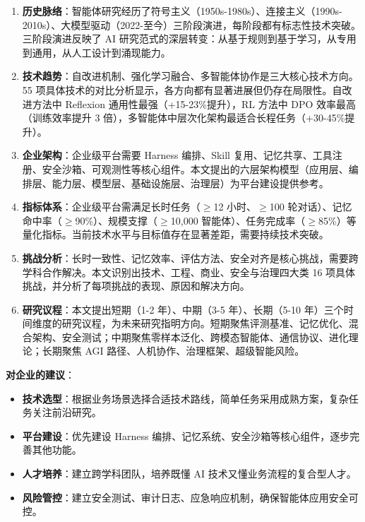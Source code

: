\documentclass[12pt,a4paper]{article}
\begin{document}
\begin{enumerate}
    \item \textbf{历史脉络}：智能体研究经历了符号主义（1950s-1980s）、连接主义（1990s-2010s）、大模型驱动（2022-至今）三阶段演进，每阶段都有标志性技术突破。三阶段演进反映了 AI 研究范式的深层转变：从基于规则到基于学习，从专用到通用，从人工设计到涌现能力。
    
    \item \textbf{技术趋势}：自改进机制、强化学习融合、多智能体协作是三大核心技术方向。55 项具体技术的对比分析显示，各方向都有显著进展但仍存在局限性。自改进方法中 Reflexion 通用性最强（+15-23\%提升），RL 方法中 DPO 效率最高（训练效率提升 3 倍），多智能体中层次化架构最适合长程任务（+30-45\%提升）。
    
    \item \textbf{企业架构}：企业级平台需要 Harness 编排、Skill 复用、记忆共享、工具注册、安全沙箱、可观测性等核心组件。本文提出的六层架构模型（应用层、编排层、能力层、模型层、基础设施层、治理层）为平台建设提供参考。
    
    \item \textbf{指标体系}：企业级平台需满足长时任务（$\geq$12 小时、$\geq$100 轮对话）、记忆命中率（$\geq$90\%）、规模支撑（$\geq$10,000 智能体）、任务完成率（$\geq$85\%）等量化指标。当前技术水平与目标值存在显著差距，需要持续技术突破。
    
    \item \textbf{挑战分析}：长时一致性、记忆效率、评估方法、安全对齐是核心挑战，需要跨学科合作解决。本文识别出技术、工程、商业、安全与治理四大类 16 项具体挑战，并分析了每项挑战的表现、原因和解决方向。
    
    \item \textbf{研究议程}：本文提出短期（1-2 年）、中期（3-5 年）、长期（5-10 年）三个时间维度的研究议程，为未来研究指明方向。短期聚焦评测基准、记忆优化、混合架构、安全测试；中期聚焦零样本泛化、跨模态智能体、通信协议、进化理论；长期聚焦 AGI 路径、人机协作、治理框架、超级智能风险。
\end{enumerate}

\textbf{对企业的建议}：
\begin{itemize}
    \item \textbf{技术选型}：根据业务场景选择合适技术路线，简单任务采用成熟方案，复杂任务关注前沿研究。
    \item \textbf{平台建设}：优先建设 Harness 编排、记忆系统、安全沙箱等核心组件，逐步完善其他功能。
    \item \textbf{人才培养}：建立跨学科团队，培养既懂 AI 技术又懂业务流程的复合型人才。
    \item \textbf{风险管控}：建立安全测试、审计日志、应急响应机制，确保智能体应用安全可控。
\end{itemize}
\end{document}

